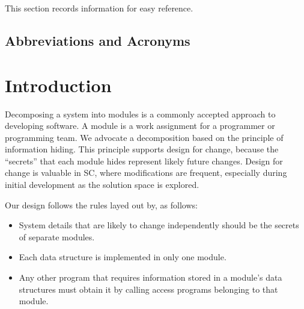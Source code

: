\documentclass[12pt, titlepage]{article}
\begin{document}
This section records information for easy reference.

\subsection{Abbreviations and Acronyms}

\renewcommand{\arraystretch}{1.2}

\newpage

\tableofcontents

\listoftables

\listoffigures

\newpage


\section{Introduction}

Decomposing a system into modules is a commonly accepted approach to developing
software.  A module is a work assignment for a programmer or programming
team.  We advocate a decomposition
based on the principle of information hiding.  This
principle supports design for change, because the ``secrets'' that each module
hides represent likely future changes.  Design for change is valuable in SC,
where modifications are frequent, especially during initial development as the
solution space is explored.  

Our design follows the rules layed out by, as follows:
\begin{itemize}
\item System details that are likely to change independently should be the
  secrets of separate modules.
\item Each data structure is implemented in only one module.
\item Any other program that requires information stored in a module's data
  structures must obtain it by calling access programs belonging to that module.
\end{itemize}
\end{document}
